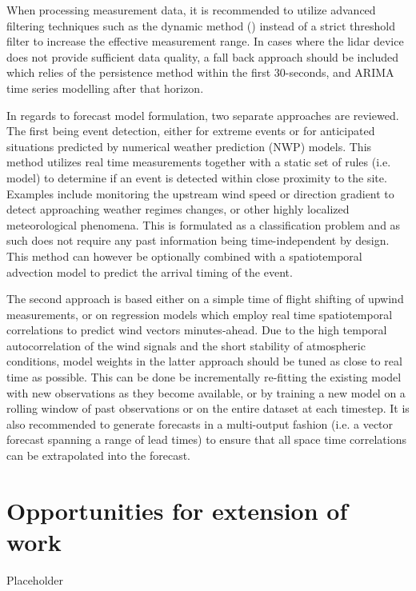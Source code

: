 When processing measurement data, it is recommended to utilize advanced filtering techniques such as the dynamic method (\cite{beck_dynamic_2017}) instead of a strict threshold filter to increase the effective measurement range. In cases where the lidar device does not provide sufficient data quality, a fall back approach should be included which relies of the persistence method within the first 30-seconds, and ARIMA time series modelling after that horizon.

In regards to forecast model formulation, two separate approaches are reviewed. The first being event detection, either for extreme events or for anticipated situations predicted by numerical weather prediction (NWP) models. This method utilizes real time measurements together with a static set of rules (i.e. model) to determine if an event is detected within close proximity to the site. Examples include monitoring the upstream wind speed or direction gradient to detect approaching weather regimes changes, or other highly localized meteorological phenomena. This is formulated as a classification problem and as such does not require any past information being time-independent by design. This method can however be optionally combined with a spatiotemporal advection model to predict the arrival timing of the event.

The second approach is based either on a simple time of flight shifting of upwind measurements, or on regression models which employ real time spatiotemporal correlations to predict wind vectors minutes-ahead. Due to the high temporal autocorrelation of the wind signals and the short stability of atmospheric conditions, model weights in the latter approach should be tuned as close to real time as possible. This can be done be incrementally re-fitting the existing model with new observations as they become available, or by training a new model on a rolling window of past observations or on the entire dataset at each timestep. It is also recommended to generate forecasts in a multi-output fashion (i.e. a vector forecast spanning a range of lead times) to ensure that all space time correlations can be extrapolated into the forecast.


\clearpage
\section{Opportunities for extension of work}
\label{sec:discussion_extension}

Placeholder

\begin{comment}
•	Probabilistic output
•	Explore uncertainties
•	Use longer range systems
•	Combine data set with wind farm SCADA for control possibilities
Track the wind with lidar scan, fit on the fly
Volumetric wind field tracking
\end{comment}
